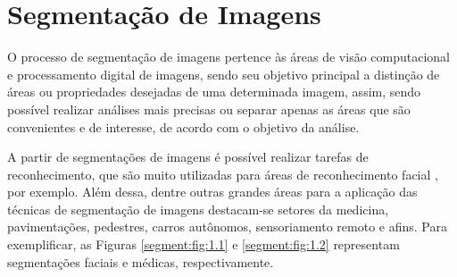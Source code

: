 \newpage
\clearpage
\section{Segmentação de Imagens}
\label{segment:image}

O processo de segmentação de imagens pertence às áreas de visão computacional e processamento digital de imagens, sendo seu objetivo principal a distinção de áreas ou propriedades desejadas \cite{Haralick1985, Yuheng2017, Ghosh2019} de uma determinada imagem, assim, sendo possível realizar análises mais precisas ou separar apenas as áreas que são convenientes e de interesse, de acordo com o objetivo da análise.

A partir de segmentações de imagens é possível realizar tarefas de reconhecimento, que são muito utilizadas para áreas de reconhecimento facial \cite{Yuheng2017}, por exemplo. Além dessa, dentre outras grandes áreas para a aplicação das técnicas de segmentação de imagens destacam-se setores da medicina, pavimentações, pedestres, carros autônomos, sensoriamento remoto e afins. Para exemplificar, as Figuras \ref{segment:fig:1.1} e \ref{segment:fig:1.2} representam segmentações faciais e médicas, respectivamente.  

